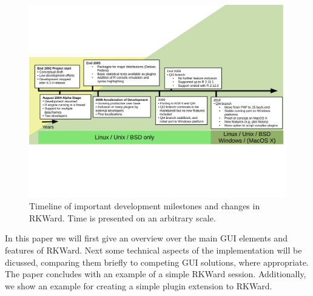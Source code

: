 \begin{figure}[htp]
 \centering
 \includegraphics[clip=true,trim=0cm 5.7cm 0cm 5.7cm,width=16cm]{../figures/timeline.pdf}
 \caption{Timeline of important development milestones and changes in RKWard.
          Time is presented on an arbitrary scale.}
 \label{fig:timeline}
\end{figure}

In this paper we will first give an overview over the main GUI elements and
features of RKWard. Next some technical aspects of the implementation will be
dicussed, comparing them briefly to competing GUI solutions, where appropriate.
The paper concludes with an example of a simple RKWard session. Additionally,
we show an example for creating a simple plugin extension to RKWard.
